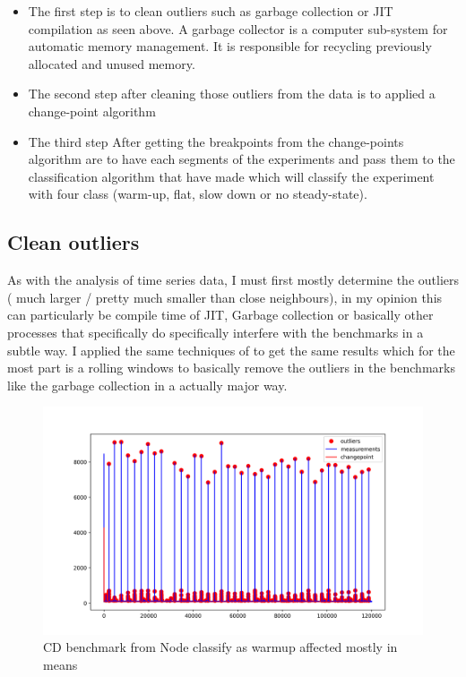 \documentclass{article}
\begin{document}
\begin{itemize}
    \item The first step is to clean outliers such as garbage collection or JIT compilation as seen above. A garbage collector       is a computer sub-system for automatic memory management.  It is responsible for recycling previously allocated and       unused memory.  
    \item The second step after cleaning those outliers from the data is to applied a change-point algorithm \cite{killick2014changepoint}
    \item The third step After getting the breakpoints from the change-points algorithm are to have each segments of the experiments and pass them to the classification algorithm that \cite{barrett2017virtual} have made which will classify the experiment with four class (warm-up, flat, slow down or no steady-state).
\end{itemize}




\subsection{Clean outliers}

As with the analysis of time series data, I must first mostly determine the outliers ( much larger / pretty much smaller than close neighbours), in my opinion \cite{barrett2017virtual} this can particularly be compile time of JIT, Garbage collection or basically other processes that specifically do specifically interfere with the benchmarks in a subtle way. I applied the same techniques of \cite{barrett2017virtual} to get the same results which for the most part is a rolling windows to basically remove the outliers in the benchmarks like the garbage collection in a actually major way.

\begin{figure}[h!]
    \centering
    \includegraphics[width=1\textwidth]{images/plot_13_flat.png}
    \caption{CD benchmark from Node classify as warmup affected mostly in means}
    \label{fig:bench_node_flat}
\end{figure}
\end{document}
